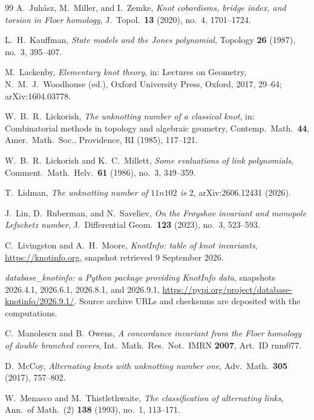 \documentclass[12pt, oneside]{amsart}
\begin{document}
\begin{thebibliography}{99}
     A.~Juh\'asz, M.~Miller, and I.~Zemke, \emph{Knot cobordisms, bridge index, and
        torsion in Floer homology}, J.~Topol.\ \textbf{13} (2020), no.~4, 1701--1724.

     L.~H.~Kauffman, \emph{State models and the Jones polynomial}, Topology
    \textbf{26} (1987), no.~3, 395--407.

     M.~Lackenby, \emph{Elementary knot theory}, in:
    Lectures on Geometry, N.~M.~J.~Woodhouse (ed.), Oxford University Press, Oxford,
    2017, 29--64; arXiv:1604.03778.

     W.~B.~R.~Lickorish, \emph{The unknotting number of a classical knot}, in:
    Combinatorial methods in topology and algebraic geometry, Contemp.\ Math.\ \textbf{44}, Amer.\
    Math.\ Soc., Providence, RI (1985), 117--121.

     W.~B.~R.~Lickorish and K.~C.~Millett, \emph{Some evaluations of link
        polynomials}, Comment.\ Math.\ Helv.\ \textbf{61} (1986), no.~3, 349--359.

     T.~Lidman, \emph{The unknotting number of $11n102$ is $2$}, arXiv:2606.12431 (2026).

     J.~Lin, D.~Ruberman, and N.~Saveliev,
    \emph{On the Fr{\o}yshov invariant and monopole Lefschetz number},
    J.~Differential Geom.\ \textbf{123} (2023), no.~3, 523--593.

     C.~Livingston and A.~H.~Moore, \emph{KnotInfo: table of knot invariants},
    \url{https://knotinfo.org}, snapshot retrieved 9 September 2026.

     \emph{database\_knotinfo: a Python package
    providing KnotInfo data}, snapshots 2026.4.1, 2026.6.1, 2026.8.1, and
    2026.9.1, \url{https://pypi.org/project/database-knotinfo/2026.9.1/}.
    Source archive URLs and checksums are deposited with the computations.

     C.~Manolescu and B.~Owens, \emph{A concordance invariant from the Floer homology
        of double branched covers}, Int.\ Math.\ Res.\ Not.\ IMRN \textbf{2007}, Art.\ ID rnm077.

     D.~McCoy, \emph{Alternating knots with unknotting number one}, Adv.\ Math.\
    \textbf{305} (2017), 757--802.

     W.~Menasco and M.~Thistlethwaite, \emph{The classification of alternating
        links}, Ann.\ of Math.\ (2) \textbf{138} (1993), no.~1, 113--171.


\end{thebibliography}
\end{document}
